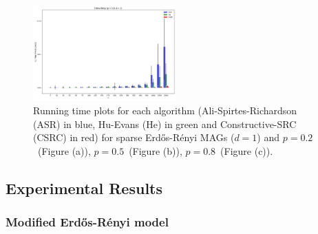 \documentclass[a4paper]{article}
\begin{document}
\begin{figure}[htbp]
	\centering
	\hfill
	
	\includegraphics[width=0.49\textwidth]{figures/Figure_3.png}
	
	\caption{Running time plots for each algorithm (Ali-Spirtes-Richardson (ASR) in blue, Hu-Evans (He) in green and Constructive-SRC (CSRC) in red) for sparse Erd\H{o}s-R\'{e}nyi MAGs ($d=1$) and $p=0.2$~(Figure (a)), $p=0.5$~(Figure (b)), $p=0.8$~(Figure (c)).}
	\label{fig:er-1}
\end{figure}

\subsection{Experimental Results}

\subsubsection{Modified Erd\H{o}s-R\'{e}nyi model}
\end{document}
